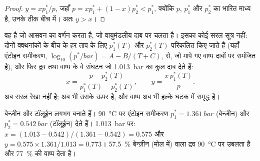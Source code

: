 \begin{proof}
$y = xp_1^*/p$, जहाँ $p = xp_1^* + (1 - x)p_2^* < p_1^*$, क्योंकि $p$,
$p_1^*$ और $p_2^*$ का भारित माध्य है, उनके ठीक बीच में। अतः $y >
x$।
\end{proof}

 वह है जो आसवन का वर्णन करता है, जो वायुमंडलीय दाब पर
चलता है। इसका कोई सरल सूत्र नहीं: दोनों क्वथनांकों के बीच के हर ताप के लिए
$p_1^*(T)$ और $p_2^*(T)$ परिकलित किए जाते हैं (यहाँ
एंटोइन समीकरण, $\log_{10}(p^*/\unit{bar}) = A - B/(T + C)$, से, जो
मापे गए वाष्प दाबों पर समंजित है), और फिर द्रव तथा वाष्प के वे संघटन जो
\qty{1.013}{bar} का कुल दाब देते हैं:
\[
  x = \frac{p - p_2^*(T)}{p_1^*(T) - p_2^*(T)}, \qquad y = \frac{x\,p_1^*(T)}{p} .
\]
 अब सरल रेखा नहीं है;  अब भी उसके ऊपर है,
और वाष्प अब भी हल्के घटक में समृद्ध है।

\begin{example}\label{ex:b2:liquid-vapour-diagrams:benzene-toluene}
बेन्ज़ीन और टॉलूईन लगभग  बनाते हैं। \qty{90}{\degreeCelsius} पर
एंटोइन समीकरण $p_1^* = \qty{1.361}{bar}$ (बेन्ज़ीन) और $p_2^* =
\qty{0.542}{bar}$ (टॉलूईन) देते हैं। \qty{1.013}{bar} पर: $x = (1.013 - 0.542)/(1.361 -
0.542) = 0.575$ और $y = 0.575 \times 1.361/1.013 = 0.773$। 57.5~\%
बेन्ज़ीन (मोल में) वाला द्रव \qty{90}{\degreeCelsius} पर उबलता है और
77~\% की वाष्प देता है।
\end{example}

